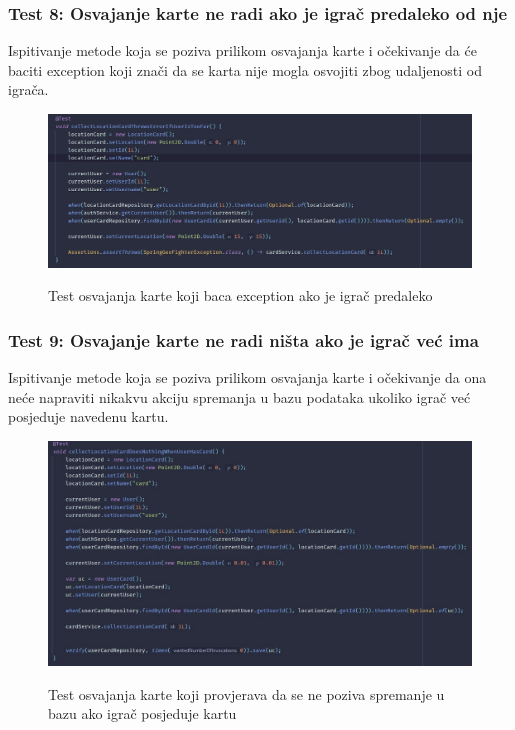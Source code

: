 			\subsubsection{Test 8: Osvajanje karte ne radi ako je igrač predaleko od nje}
			Ispitivanje metode koja se poziva prilikom osvajanja karte i očekivanje da će baciti exception koji znači da se karta nije mogla osvojiti zbog udaljenosti od igrača.
			
			\begin{figure}[H]
				\centering
				\includegraphics[scale=0.55]{slike/test8} \\
				\caption{ Test osvajanja karte koji baca exception ako je igrač predaleko }
				\label{fig:test8}
			\end{figure}
		
			\subsubsection{Test 9: Osvajanje karte ne radi ništa ako je igrač već ima}
			Ispitivanje metode koja se poziva prilikom osvajanja karte i očekivanje da ona neće napraviti nikakvu akciju spremanja u bazu podataka ukoliko igrač već posjeduje navedenu kartu.
			
			\begin{figure}[H]
				\centering
				\includegraphics[scale=0.55]{slike/test9} \\
				\caption{ Test osvajanja karte koji provjerava da se ne poziva spremanje u bazu ako igrač posjeduje kartu}
				\label{fig:test9}
			\end{figure}
		
